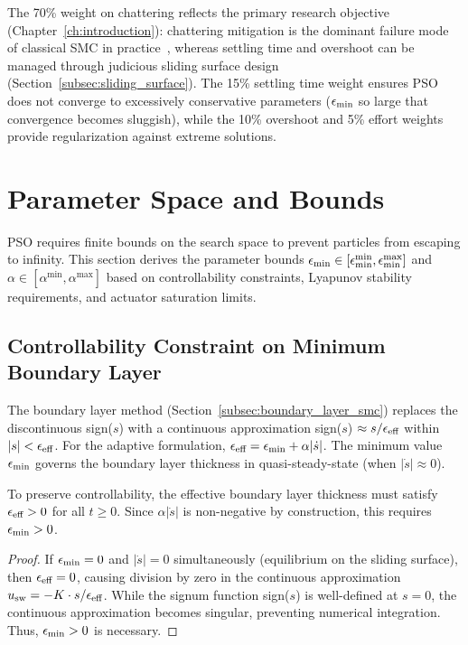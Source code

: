 The 70\% weight on chattering reflects the primary research objective (Chapter~\ref{ch:introduction}): chattering mitigation is the dominant failure mode of classical SMC in practice~\cite{young1999survey}, whereas settling time and overshoot can be managed through judicious sliding surface design (Section~\ref{subsec:sliding_surface}). The 15\% settling time weight ensures PSO does not converge to excessively conservative parameters ($\epsilon_{\min}$ so large that convergence becomes sluggish), while the 10\% overshoot and 5\% effort weights provide regularization against extreme solutions.

\section{Parameter Space and Bounds}
\label{sec:parameter_space}

PSO requires finite bounds on the search space to prevent particles from escaping to infinity. This section derives the parameter bounds $\epsilon_{\min} \in [\epsilon_{\min}^{\min}, \epsilon_{\min}^{\max}]$ and $\alpha \in [\alpha^{\min}, \alpha^{\max}]$ based on controllability constraints, Lyapunov stability requirements, and actuator saturation limits.

\subsection{Controllability Constraint on Minimum Boundary Layer}
\label{subsec:controllability_constraint}

The boundary layer method (Section~\ref{subsec:boundary_layer_smc}) replaces the discontinuous sign($s$) with a continuous approximation sign($s$) $\approx s/\epsilon_{\text{eff}}$ within $|s| < \epsilon_{\text{eff}}$. For the adaptive formulation, $\epsilon_{\text{eff}} = \epsilon_{\min} + \alpha |\dot{s}|$. The minimum value $\epsilon_{\min}$ governs the boundary layer thickness in quasi-steady-state (when $|\dot{s}| \approx 0$).

\begin{lemma}
\label{lem:positive_epsilon}
To preserve controllability, the effective boundary layer thickness must satisfy $\epsilon_{\text{eff}} > 0$ for all $t \geq 0$. Since $\alpha |\dot{s}|$ is non-negative by construction, this requires $\epsilon_{\min} > 0$.
\end{lemma}

\begin{proof}
If $\epsilon_{\min} = 0$ and $|\dot{s}| = 0$ simultaneously (equilibrium on the sliding surface), then $\epsilon_{\text{eff}} = 0$, causing division by zero in the continuous approximation $u_{\text{sw}} = -K \cdot s / \epsilon_{\text{eff}}$. While the signum function sign($s$) is well-defined at $s=0$, the continuous approximation becomes singular, preventing numerical integration. Thus, $\epsilon_{\min} > 0$ is necessary.
\end{proof}

